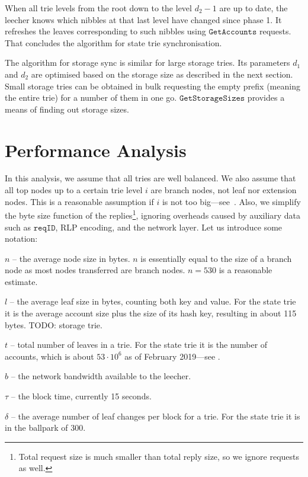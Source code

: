 \documentclass{amsart}
\begin{document}
When all trie levels from the root down to the level $d_2 - 1$ are up to date,
the leecher knows which nibbles at that last level have changed since phase 1.
It refreshes the leaves corresponding to such nibbles using $\texttt{GetAccounts}$ requests. 
That concludes the algorithm for state trie synchronisation.

The algorithm for storage sync is similar for large storage tries.
Its parameters $d_1$ and $d_2$ are optimised based on the storage size as described in the next section.
Small storage tries can be obtained in bulk requesting the empty prefix (meaning the entire trie) for a number of them in one go.
$\texttt{GetStorageSizes}$ provides a means of finding out storage sizes.

\section{Performance Analysis}

In this analysis, we assume that all tries are well balanced.
We also assume that all top nodes up to a certain trie level $i$ are branch nodes, not leaf nor extension nodes.
This is a reasonable assumption if $i$ is not too big---see~\cite{akhunov_1x_workshop_part2}.
Also, we simplify the byte size function of the replies\footnote{Total
request size is much smaller than total reply size, so we ignore requests as well.},
ignoring overheads caused by auxiliary data such as $\texttt{reqID}$,
RLP encoding, and the network layer.
Let us introduce some notation:

$n$ -- the average node size in bytes.
$n$ is essentially equal to the size of a branch node as most nodes transferred are branch nodes.
$n = 530$ is a reasonable estimate.

$l$ -- the average leaf size in bytes, counting both key and value.
For the state trie it is the average account size plus the size of its hash key,
resulting in about 115 bytes.
TODO: storage trie.

$t$ -- total number of leaves in a trie.
For the state trie it is the number of accounts,
which is about $53 \cdot 10^6$ as of February 2019---see \cite{akhunov_1x_workshop_part2}.

$b$ -- the network bandwidth available to the leecher.

$\tau$ -- the block time, currently 15 seconds.

$\delta$ -- the average number of leaf changes per block for a trie.
For the state trie it is in the ballpark of 300.
\end{document}
